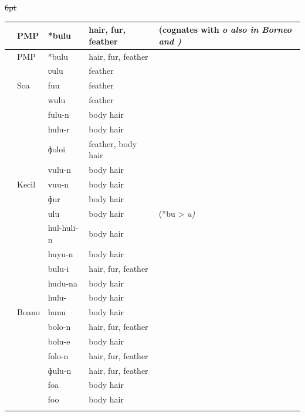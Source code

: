 {\st{6pt}\begin{xltabular}[l]{\linewidth}
{>{\hspace{-\tabcolsep}}l<{\hspace{-\tabcolsep}}
>{\hspace{-\tabcolsep}\enspace}lll
>{\raggedright\arraybackslash}X}
\lsptoprule
{}	&	PMP	&	*bulu	&	hair, fur, feather	&	(cognates with \it{o} also in Borneo and )	\\	\midrule
\endfirsthead
\lsptoprule
{}	&	PMP	&	*bulu	&	hair, fur, feather	&		\\	\midrule
\endhead
	&		&	ʋulu	&	feather	&		\\
	&	So{\Q}a	&	fuu	&	feather	&		\\
	&		&	wulu	&	feather	&		\\
	&		&	fulu-n	&	body hair	&		\\
	&		&	hulu-r	&	body hair	&		\\
\rcl	&		&	ɸoloi	&	feather, body hair	&		\\
	&		&	vulu-n	&	body hair	&		\\
	&	 Kecil	&	vuu-n	&	body hair	&		\\
	&		&	ɸur	&	body hair	&		\\
	&		&	ulu	&	body hair	&	 (*bu > \it{u})	\\
	&		&	hul-huli-n	&	body hair	&		\\
	&		&	huyu-n	&	body hair	&		\\
	&		&	bulu-i	&	hair, fur, feather	&		\\
	&		&	hudu-na	&	body hair	&		\\
	&		&	hulu-	&	body hair	&		\\
	&	Boano	&	hunu	&	body hair	&		\\
\rcl	&		&	bolo-n	&	hair, fur, feather	&		\\
\rcl	&		&	bolu-e	&	body hair	&		\\
\rcl	&		&	folo-n	&	hair, fur, feather	&		\\
	&		&	ɸulu-n	&	hair, fur, feather	&		\\
\rcl	&		&	foa	&	body hair	&		\\
\rcl	&		&	foo	&	body hair	&		\\
\lspbottomrule
\end{xltabular}\addtocounter{table}{-1}}

